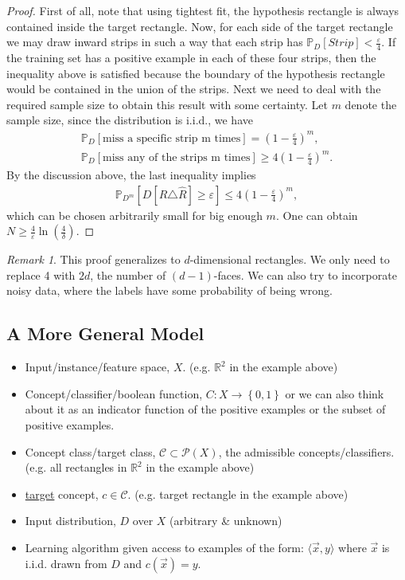\documentclass[12pt, letterpaper]{article}
\numberwithin{equation}{section} %
\newcommand{\R}{\mathbb{R}}
\newcommand{\ul}{\underline}
\newcommand{\mb}{\mathbb}
\newcommand{\mc}{\mathcal}
\newcommand{\ve}{\varepsilon}
\theoremstyle{definition}
\theoremstyle{remark}
\newtheorem{remark}[theorem]{Remark}
\begin{document}
\begin{proof}
	First of all, note that using tightest fit, the hypothesis rectangle is always contained inside the target rectangle. 
	Now, for each side of the target rectangle we may draw inward strips in such a way that each strip has $\mb P_D[Strip] < \frac{\ve}{4}$. 
	If the training set has a positive example in each of these four strips, then the inequality above is satisfied because the boundary of the hypothesis rectangle would be contained in the union of the strips. 
	Next we need to deal with the required sample size to obtain this result with some certainty. 
	Let $m$ denote the sample size, since the distribution is i.i.d., we have
	\begin{align*}
		\mb P_D[\textrm{miss a specific strip m times}] = \left(1-\frac{\ve}{4}\right)^m,\\
		\mb P_D[\textrm{miss any of the strips m times}] \geq 4\left(1-\frac{\ve}{4}\right)^m.
	\end{align*}
	By the discussion above, the last inequality implies
	\begin{align*}
		\mb P_{D^m}[D[R\triangle\hat R]\geq \ve] \leq 4\left(1-\frac{\ve}{4}\right)^m,
	\end{align*}
	which can be chosen arbitrarily small for big enough $m$. 
	One can obtain $N\geq \frac4\ve \ln\left(\frac4\delta\right)$.
\end{proof}

\begin{remark}
	This proof generalizes to $d$-dimensional rectangles. 
	We only need to replace 4 with $2d$, the number of $(d-1)$-faces.
	We can also try to incorporate noisy data, where the labels have some probability of being wrong.
\end{remark}


\subsection{A More General Model}

\begin{itemize}
	\item Input/instance/feature space, $X$. (e.g. $\R^2$ in the example above)
	\item Concept/classifier/boolean function, $C: X \rightarrow \left\{0,1\right\}$ or we can also think about it as an indicator function of the positive examples or the subset of positive examples.
	\item Concept class/target class, $\mc C \subset \mc P(X)$, the admissible concepts/classifiers. (e.g. all rectangles in $\R^2$ in the example above)
	\item \ul{target} concept, $c\in\mc C$. (e.g. target rectangle in the example above)
	\item Input distribution, $D$ over $X$ (arbitrary \& unknown)
	\item Learning algorithm given access to examples of the form: $\langle \vec x,y \rangle$ where $\vec x$ is i.i.d. drawn from $D$ and $c(\vec x) = y$.
\end{itemize}
\end{document}
